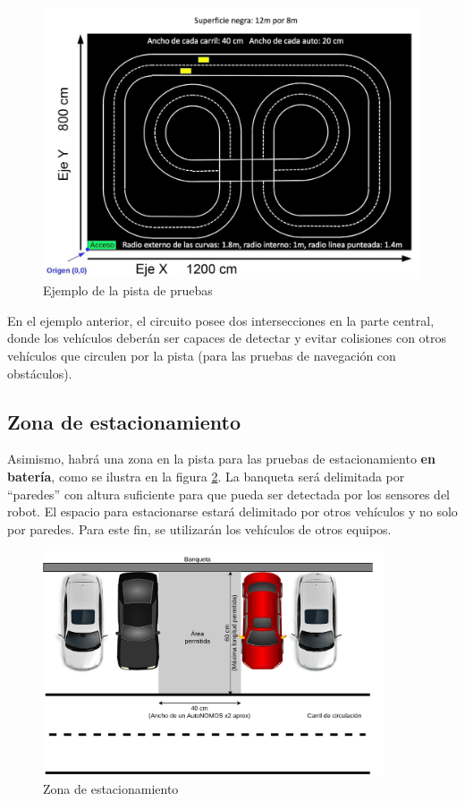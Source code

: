\documentclass[letterpaper,12pt]{article}
\begin{document}
\begin{figure}[h!]
  \centering
  \includegraphics[width=\textwidth]{Figures/pista.png}
  \caption{Ejemplo de la pista de pruebas}
  \label{fig:Arena}
\end{figure}

En el ejemplo anterior, el circuito posee dos intersecciones en la parte central, donde los vehículos deberán ser capaces de detectar y evitar colisiones con otros vehículos que circulen por la pista (para las pruebas de navegación con obstáculos). 

\subsection{Zona de estacionamiento}
Asimismo, habrá una zona en la pista para las pruebas de estacionamiento \textbf{en batería}, como se ilustra en la figura \ref{fig:Parking}. La banqueta será delimitada por “paredes” con altura suficiente para que pueda ser detectada por los sensores del robot. El espacio para estacionarse estará delimitado por otros vehículos y no solo por paredes. Para este fin, se utilizarán los vehículos de otros equipos.
\begin{figure}
  \centering
  \includegraphics[width=0.9\textwidth]{Figures/Parking.pdf}
  \caption{Zona de estacionamiento}
  \label{fig:Parking}
\end{figure}
\end{document}
